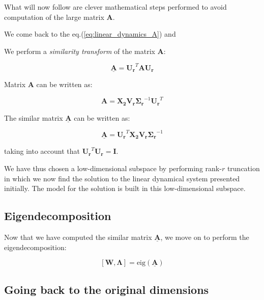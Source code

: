 \documentclass[10pt,twocolumn]{article}
\begin{document}
What will now follow are clever mathematical steps performed to avoid computation of the large matrix $\bm{A}$.

We come back to the eq.(\ref{eq:linear_dynamics_A}) and

We perform a \textit{similarity transform} of the matrix $\bm{A}$:

\begin{equation} \label{eq:similarity-transform}
\underline{\bm{A}} = \bm{U_r}^T \bm{A} \bm{U_r}
\end{equation}

Matrix $\bm{A}$ can be written as:

\begin{equation} \label{eq:A}
\bm{A} = \bm{X_2} \bm{V_r} \bm{\Sigma_r}^{-1} \bm{U_r}^T
\end{equation}

The similar matrix $\underline{\bm{A}}$ can be written as:

\begin{equation} \label{eq:A_underline}
\underline{\bm{A}} = \bm{U_r}^T \bm{X_2} \bm{V_r} \bm{\Sigma_r}^{-1} 
\end{equation}

taking into account that $\bm{U_r}^T \bm{U_r} = \bm{I}$.

We have thus chosen a low-dimensional subspace by performing rank-$r$ truncation in which we now find the solution to the linear dynamical system presented initially. The model for the solution is built in this low-dimensional subspace.

\subsection{Eigendecomposition}

Now that we have computed the similar matrix $\underline{\bm{A}}$, we move on to perform the eigendecomposition:

\begin{equation} \label{eq:A_underline}
[\bm{W}, \bm{\Lambda}] = \text{eig}(\underline{\bm{A}})
\end{equation}







\subsection{Going back to the original dimensions}
\end{document}
